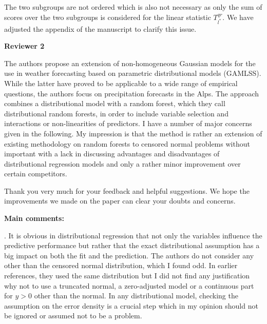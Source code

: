 \documentclass[american,foldmarks=false,noconfig]{uibklttr}
\newenvironment{review}{\fontshape{\itdefault}\fontseries{\bfdefault} \selectfont \smallskip}{\par}
\begin{document}
The two subgroups are not ordered which is also not necessary as only 
the sum of scores over the two subgroups is considered for the linear 
statistic $T_{l^{\ast}}^{qr}$. We have adjusted the appendix of
the manuscript to clarify this issue.

\newpage


\textbf{\LARGE Reviewer 2}

\begin{review}
The authors propose an extension of non-homogeneous Gaussian models 
for the use in weather forecasting based on parametric distributional 
models (GAMLSS). While the latter have proved to be applicable to a 
wide range of empirical questions, the authors focus on precipitation 
forecasts in the Alps. The approach combines a distributional model 
with a random forest, which they call distributional random forests, 
in order to include variable selection and interactions or 
non-linearities of predictors. I have a number of major concerns 
given in the following. My impression is that the method is rather
an extension of existing methodology on random forests to censored 
normal problems without important with a lack in discussing 
advantages and disadvantages of distributional regression models 
and only a rather minor improvement over certain competitors.
\end{review}

Thank you very much for your feedback and helpful suggestions. We hope 
the improvements we made on the paper can clear your doubts and concerns.

\bigskip

\textbf{Main comments:}

\begin{review}
1. It is obvious in distributional regression that not only the 
variables influence the predictive performance but rather that 
the exact distributional assumption has a big impact on both the 
fit and the prediction. The authors do not consider any other
than the censored normal distribution, which I found odd. 
In earlier references, they used the same distribution but I 
did not find any justification why not to use a truncated normal, 
a zero-adjusted model or a continuous part for $y > 0$ other
than the normal. In any distributional model, checking the 
assumption on the error density is a crucial step which in 
my opinion should not be ignored or assumed not to be a problem.
\end{review}
\end{document}

